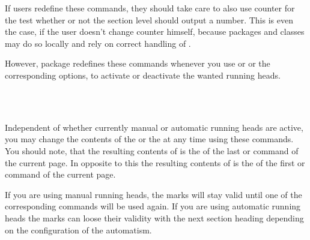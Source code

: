 If users redefine these commands, they should take care
to also use counter  for the test whether or not the
section level should output a number. This is even the case, if the user
doesn't change counter  himself, because packages and
classes may do so locally and rely on correct handling of
.

However, package  redefines these commands whenever you use
 or  or the corresponding options, to
activate or deactivate the wanted running heads.%
%
%
%
%
%
%
%
%

\begin{Declaration}
  \\
  \\
\end{Declaration}
%
%
%
Independent of whether currently manual or automatic running heads are active,
you may change the contents of the  or the 
at any time using these commands. You should note, that the resulting contents
of  is the  of the last  or  command of the
current page. In opposite to this the resulting contents of
 is the  of the first
 or  command of the current page.

If you are using manual running heads, the marks will stay valid until one of
the corresponding commands will be used again. If you are using automatic
running heads the marks can loose their validity with the next section heading
depending on the configuration of the automatism.

